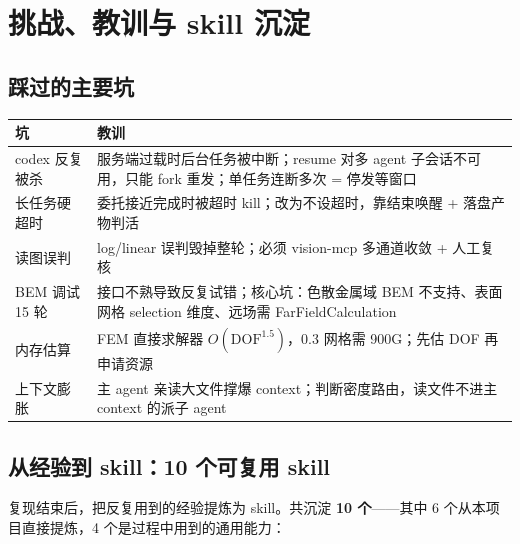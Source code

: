 \section{挑战、教训与 skill 沉淀}

\subsection{踩过的主要坑}

\begin{table}[H]
\centering\small
\begin{tabular}{@{}p{4.2cm}p{9.0cm}@{}}
\toprule
坑 & 教训 \\
\midrule
codex 反复被杀 & 服务端过载时后台任务被中断；resume 对多 agent 子会话不可用，只能 fork 重发；单任务连断多次 = 停发等窗口 \\
长任务硬超时 & 委托接近完成时被超时 kill；改为不设超时，靠结束唤醒 + 落盘产物判活 \\
读图误判 & log/linear 误判毁掉整轮；必须 vision-mcp 多通道收敛 + 人工复核 \\
BEM 调试 15 轮 & 接口不熟导致反复试错；核心坑：色散金属域 BEM 不支持、表面网格 selection 维度、远场需 FarFieldCalculation \\
内存估算 & FEM 直接求解器 $O(\mathrm{DOF}^{1.5})$，0.3 网格需 900G；先估 DOF 再申请资源 \\
上下文膨胀 & 主 agent 亲读大文件撑爆 context；判断密度路由，读文件不进主 context 的派子 agent \\
\bottomrule
\end{tabular}
\end{table}

\subsection{从经验到 skill：10 个可复用 skill}

复现结束后，把反复用到的经验提炼为 skill。共沉淀 \textbf{10 个}——其中 6 个从本项目直接提炼，4 个是过程中用到的通用能力：

